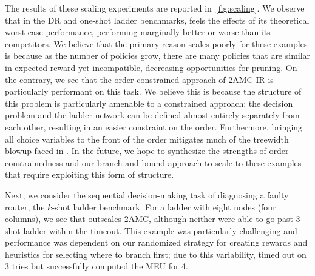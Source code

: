 The results of these scaling experiments are reported in~\cref{fig:scaling}.
We observe that in the DR and one-shot ladder benchmarks,
\dappl{} feels the effects of its theoretical worst-case performance,
performing marginally better or worse than its competitors.
We believe that the primary reason \dappl{} scales poorly for these
examples is because
as the number of policies grow, there are many policies that are similar in expected reward yet incompatible,
decreasing opportunities for pruning.
On the contrary, we see that the order-constrained approach of 2AMC IR
is particularly performant on this task.
We believe this is because the structure of this problem is particularly
amenable to a constrained approach: the decision problem and the
ladder network can be defined almost entirely separately from each other,
resulting in an easier constraint on the order. Furthermore, bringing
all choice variables to the front of the order mitigates much of the treewidth
blowup faced in \dappl. In the future, we hope to synthesize the strengths
of order-constrainedness and our branch-and-bound approach to scale to
these examples that require exploiting this form of structure.


Next, we consider the sequential decision-making task of
diagnosing a faulty router, the $k$-shot ladder benchmark.  For a ladder with
eight nodes (four columns), we see that \dappl{} outscales 2AMC, although
neither were able to go past 3-shot ladder within the timeout. This example
was particularly challenging and performance was dependent
on our randomized
strategy for creating rewards
and heuristics for selecting where to branch first; due to this variability, \dappl{} timed out on
3 tries but successfully computed the MEU for 4.

